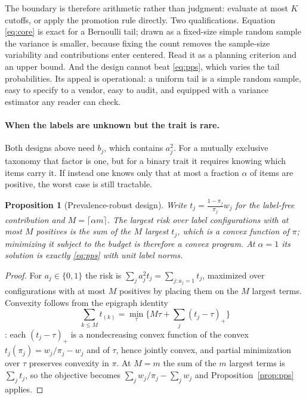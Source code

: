 \documentclass[11pt]{article}
\newcommand{\pos}[1]{\left(#1\right)_+}
\theoremstyle{plain}
\newtheorem{proposition}{Proposition}
\theoremstyle{remark}
\begin{document}
The boundary is therefore arithmetic rather than judgment: evaluate at most $K$ cutoffs, or apply the promotion rule directly. Two qualifications. Equation \eqref{eq:core} is exact for a Bernoulli tail; drawn as a fixed-size simple random sample the variance is smaller, because fixing the count removes the sample-size variability and contributions enter centered. Read it as a planning criterion and an upper bound. And the design cannot beat \eqref{eq:pps}, which varies the tail probabilities. Its appeal is operational: a uniform tail is a simple random sample, easy to specify to a vendor, easy to audit, and equipped with a variance estimator any reader can check.

\paragraph{When the labels are unknown but the trait is rare.} Both designs above need $b_j$, which contains $a_j^2$. For a mutually exclusive taxonomy that factor is one, but for a binary trait it requires knowing which items carry it. If instead one knows only that at most a fraction $\alpha$ of items are positive, the worst case is still tractable.

\begin{proposition}[Prevalence-robust design]
\label{prop:robust}
Write $t_j=\frac{1-\pi_j}{\pi_j}w_j$ for the label-free contribution and $M=\lceil\alpha m\rceil$. The largest risk over label configurations with at most $M$ positives is the sum of the $M$ largest $t_j$, which is a convex function of $\pi$; minimizing it subject to the budget is therefore a convex program. At $\alpha=1$ its solution is exactly \eqref{eq:pps} with unit label norms.
\end{proposition}

\begin{proof}
For $a_j\in\{0,1\}$ the risk is $\sum_ja_j^2t_j=\sum_{j:a_j=1}t_j$, maximized over configurations with at most $M$ positives by placing them on the $M$ largest terms. Convexity follows from the epigraph identity
\[
\sum_{k\le M}t_{(k)}=\min_{\tau}\Big\{M\tau+\sum_j\pos{t_j-\tau}\Big\}
\]
\citep[see][]{BoydVandenberghe2004}: each $\pos{t_j-\tau}$ is a nondecreasing convex function of the convex $t_j(\pi_j)=w_j/\pi_j-w_j$ and of $\tau$, hence jointly convex, and partial minimization over $\tau$ preserves convexity in $\pi$. At $M=m$ the sum of the $m$ largest terms is $\sum_jt_j$, so the objective becomes $\sum_jw_j/\pi_j-\sum_jw_j$ and Proposition~\ref{prop:pps} applies.
\end{proof}
\end{document}
